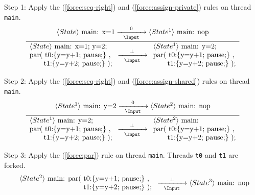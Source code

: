\noindent
Step 1: Apply the (\ref{forec:seq-right}) and (\ref{forec:assign-private}) rules on
thread \verb$main$.
\begin{equation*}
	\frac{
			\langle State \rangle ~ \text{main: x=1}
				\xrightarrow[~~\Input~~]{0} 
			\langle State^1 \rangle ~ \text{main: nop}
		}{
			\begin{array}{l}
				\langle State \rangle ~ \text{main: x=1; y=2;}	\\
				\text{par( t0:\{y=y+1; pause;\} ,}	 			\\
				\text{~~~~~~t1:\{y=y+2; pause;\} );}
			\end{array}
				\xrightarrow[~~\Input~~]{\bot} 
			\begin{array}{l}
				\langle State^1 \rangle ~ \text{main: y=2;}		\\
				\text{par( t0:\{y=y+1; pause;\} ,}		 		\\
				\text{~~~~~~t1:\{y=y+2; pause;\} );}	
			\end{array}
		}
\end{equation*}

\noindent
Step 2: Apply the (\ref{forec:seq-right}) and (\ref{forec:assign-shared}) rules 
on thread \verb$main$.
\begin{equation*}
	\frac{
			\langle State^1 \rangle ~ \text{main: y=2}
				\xrightarrow[~~\Input~~]{0} 
			\langle State^2 \rangle ~ \text{main: nop}
		}{
			\begin{array}{l}
				\langle State^1 \rangle ~ \text{main: y=2;}	\\
				\text{par( t0:\{y=y+1; pause;\} ,}	 		\\
				\text{~~~~~~t1:\{y=y+2; pause;\} );}	
			\end{array}
				\xrightarrow[~~\Input~~]{\bot} 
			\begin{array}{l}
				\langle State^2 \rangle ~ \text{main:}		\\
				\text{par( t0:\{y=y+1; pause;\} ,}	 		\\
				\text{~~~~~~t1:\{y=y+2; pause;\} );}	
			\end{array}
		}
\end{equation*}

\noindent
Step 3: Apply the (\ref{forec:par}) rule on thread \verb$main$.
Threads \verb$t0$ and \verb$t1$ are forked.
\begin{equation*}
	\begin{array}{l}
		\langle State^2 \rangle ~ \text{main: par( t0:\{y=y+1; pause;\} ,}	 \\
		\text{~~~~~~~~~~~~~~~~~~~~~~~~~~~t1:\{y=y+2; pause;\} );}
	\end{array}
		\xrightarrow[~~\Input~~]{\bot} 
	\langle State^3 \rangle ~ \text{main: nop}
\end{equation*}

